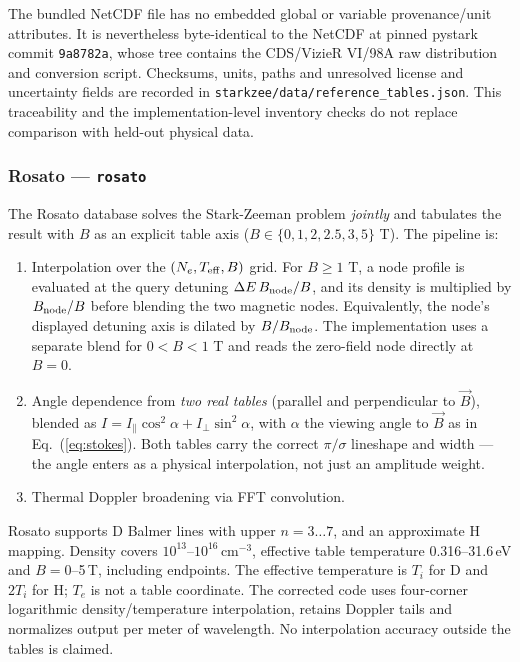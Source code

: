 \documentclass[11pt,a4paper]{article}
\numberwithin{equation}{section}
\begin{document}
The bundled NetCDF file has no embedded global or variable provenance/unit attributes. It is nevertheless byte-identical to the NetCDF at pinned pystark commit \texttt{9a8782a}, whose tree contains the CDS/VizieR VI/98A raw distribution and conversion script. Checksums, units, paths and unresolved license and uncertainty fields are recorded in \texttt{starkzee/data/reference\_tables.json}. This traceability and the implementation-level inventory checks do not replace comparison with held-out physical data.

\subsubsection{Rosato — \texttt{rosato}}

The Rosato database \cite{rosato} solves the Stark-Zeeman problem \emph{jointly} and tabulates the result with $B$ as an explicit table axis ($B \in \{0, 1, 2, 2.5, 3, 5\}$ T).  The pipeline is:
\begin{enumerate}
    \item Interpolation over the $(N_e, T_{\rm eff}, B)$ grid. For $B\ge1$ T, a node profile is evaluated at the query detuning $\Delta E\,B_{\rm node}/B$, and its density is multiplied by $B_{\rm node}/B$ before blending the two magnetic nodes. Equivalently, the node's displayed detuning axis is dilated by $B/B_{\rm node}$. The implementation uses a separate blend for $0<B<1$ T and reads the zero-field node directly at $B=0$.
    \item Angle dependence from \emph{two real tables} (parallel and perpendicular to $\vec{B}$), blended as $I = I_\parallel\cos^2\alpha + I_\perp\sin^2\alpha$, with $\alpha$ the viewing angle to $\vec{B}$ as in Eq.~(\ref{eq:stokes}).  Both tables carry the correct $\pi/\sigma$ lineshape and width — the angle enters as a physical interpolation, not just an amplitude weight.
    \item Thermal Doppler broadening via FFT convolution.
\end{enumerate}
Rosato supports D Balmer lines with upper $n=3\ldots7$, and an approximate H mapping. Density covers $10^{13}$--$10^{16}$\,cm$^{-3}$, effective table temperature 0.316--31.6\,eV and $B=0$--5\,T, including endpoints. The effective temperature is $T_i$ for D and $2T_i$ for H; $T_e$ is not a table coordinate. The corrected code uses four-corner logarithmic density/temperature interpolation, retains Doppler tails and normalizes output per meter of wavelength. No interpolation accuracy outside the tables is claimed.
\end{document}
